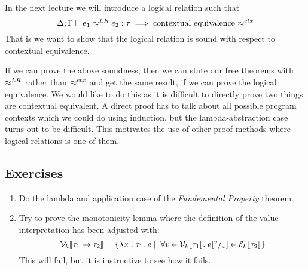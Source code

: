 In the next lecture we will introduce a logical relation such that
\[
  \Delta ; \Gamma \vdash e_1 \approx^{LR} e_2 : \tau \implies \text{contextual equivalence \ensuremath{ \approx^{ctx} }} 
\]
That is we want to show that the logical relation is sound with respect to contextual equivalence. 

If we can prove the above soundness, then we can state our free theorems with $ \approx^{LR} $ rather than $ \approx^{ctx} $ and get the same result, if we can prove the logical equivalence. We would like to do this as it is difficult to directly prove two things are contextual equivalent. A direct proof has to talk about all possible program contexts which we could do using induction, but the lambda-abstraction case turns out to be difficult. This motivates the use of other proof methods where logical relations is one of them.

\subsection*{Exercises}
\begin{enumerate}
\item Do the lambda and application case of the \emph{Fundemental Property} theorem.%
\item Try to prove the monotonicity lemma where the definition of the value interpretation has been adjusted with:
\[
\mathcal{V}_{k}\llbracket  \tau_1 \rightarrow \tau_2 \rrbracket = \{\lambda x : \tau_1 . \; e \; | \; \; \forall v \in \mathcal{V}_{k}\llbracket \tau_1 \rrbracket. \; e[^{v}/_{x}] \in \mathcal{E}_{k}\llbracket \tau_2 \rrbracket \}
\]
This will fail, but it is instructive to see how it fails.
\end{enumerate}


\clearpage
